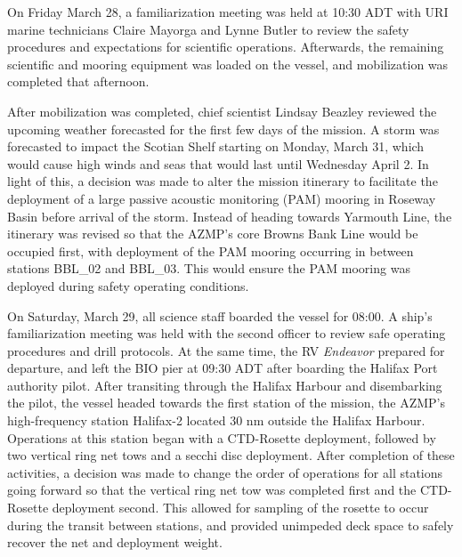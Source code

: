 \documentclass[12pt]{article}\usepackage[]{graphicx}\usepackage[]{color}
\begin{document}
On Friday March 28, a familiarization meeting was held at 10:30 ADT with URI marine technicians Claire Mayorga and Lynne Butler to review the safety procedures and expectations for scientific operations. Afterwards, the remaining scientific and mooring equipment was loaded on the vessel, and mobilization was completed that afternoon.

After mobilization was completed, chief scientist Lindsay Beazley reviewed the upcoming weather forecasted for the first few days of the mission. A storm was forecasted to impact the Scotian Shelf starting on Monday, March 31, which would cause high winds and seas that would last until Wednesday April 2. In light of this, a decision was made to alter the mission itinerary to facilitate the deployment of a large passive acoustic monitoring (PAM) mooring in Roseway Basin before arrival of the storm. Instead of heading towards Yarmouth Line, the itinerary was revised so that the AZMP's core Browns Bank Line would be occupied first, with deployment of the PAM mooring occurring in between stations BBL\_02 and BBL\_03. This would ensure the PAM mooring was deployed during safety operating conditions.

On Saturday, March 29, all science staff boarded the vessel for 08:00. A ship's familiarization meeting was held with the second officer to review safe operating procedures and drill protocols. At the same time, the RV \emph{Endeavor} prepared for departure, and left the BIO pier at 09:30 ADT after boarding the Halifax Port authority pilot. After transiting through the Halifax Harbour and disembarking the pilot, the vessel headed towards the first station of the mission, the AZMP's high-frequency station Halifax-2 located 30 nm outside the Halifax Harbour. Operations at this station began with a CTD-Rosette deployment, followed by two vertical ring net tows and a secchi disc deployment. After completion of these activities, a decision was made to change the order of operations for all stations going forward so that the vertical ring net tow was completed first and the CTD-Rosette deployment second. This allowed for sampling of the rosette to occur during the transit between stations, and provided unimpeded deck space to safely recover the net and deployment weight.
\end{document}
